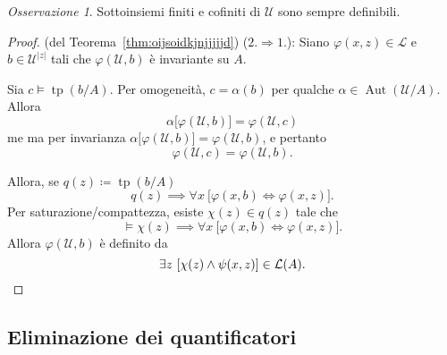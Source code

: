 \documentclass[10pt]{article}
\newcommand{\1}{\mathds{1}}
\theoremstyle{definition}%
\theoremstyle{plain}
\theoremstyle{remark}
\newtheorem*{oss}{Osservazione}
\begin{document}
\begin{oss}
Sottoinsiemi finiti e cofiniti di \(\mathcal{U}\) sono sempre definibili.
\end{oss}
\begin{proof}
(del Teorema~\ref{thm:oijsoidkjnjjjjjd})\hspace{0.7em} (\(2.\Rightarrow 1.\)): Siano \(\varphi(x,z) \in \mathcal{L}\) e \(b \in \mathcal{U}^{|z|}\) tali che \(\varphi(\mathcal{U},b)\) è invariante su \(A\).

Sia \(c\vDash \operatorname{tp}(b/A)\). Per omogeneità, \(c=\alpha(b)\) per qualche \(\alpha \in \operatorname{Aut}(\mathcal{U}/A)\). Allora
\begin{equation*}
\alpha\big[\varphi(\mathcal{U},b)\big]=\varphi(\mathcal{U},c)
\end{equation*}
me ma per invarianza \(\alpha\big[\varphi(\mathcal{U},b)\big]=\varphi(\mathcal{U},b)\), e pertanto
\begin{equation*}
\varphi(\mathcal{U},c)=\varphi(\mathcal{U},b).
\end{equation*}

Allora, se \(q(z)\coloneqq\operatorname{tp}(b/A)\)
\begin{equation*}
q(z)\implies \forall x\ \big[\varphi(x,b)\iff\varphi(x,z)\big].
\end{equation*}
Per saturazione/compattezza, esiste \(\chi(z) \in q(z)\) tale che
\begin{equation*}
\vDash \chi(z)\implies \forall x\ \big[\varphi(x,b)\iff\varphi(x,z)\big].
\end{equation*}
Allora \(\varphi(\mathcal{U},b)\) è definito da
\begin{equation*}
\exists z\ [\chi(z) \land \psi(x,z)] \in \mathcal{L}(A).\qedhere
\end{equation*}
\end{proof}
\subsection{Eliminazione dei quantificatori}
\label{sec:orgfb66856}
\end{document}
